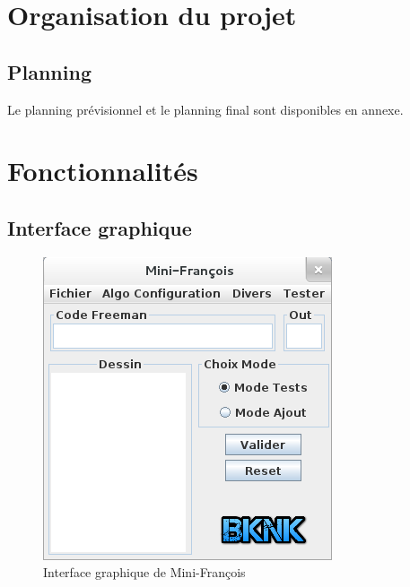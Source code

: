 \documentclass[10pt,a4paper]{report}
\begin{document}

\section{Organisation du projet}

\subsection{Planning}
\begin{flushleft}
Le planning prévisionnel et le planning final sont disponibles en annexe.
\end{flushleft}




\section{Fonctionnalités}

\subsection{Interface graphique}
\begin{figure}[!h]
	\center
		\includegraphics[scale=0.5]{./Ressource/IG.png}
 	\caption{Interface graphique de Mini-François}
\end{figure}
\end{document}
